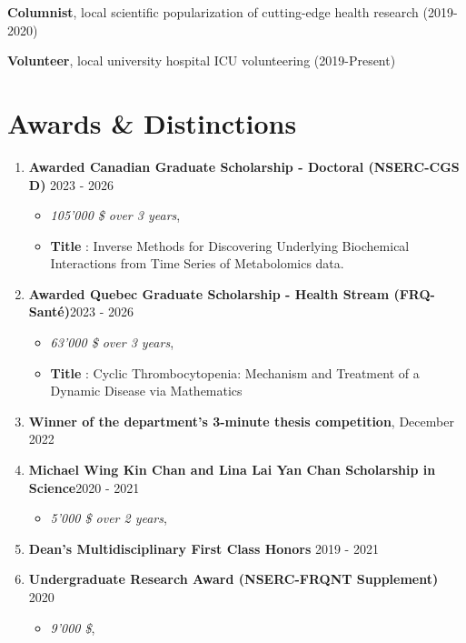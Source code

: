 \documentclass{article}
\newcommand{\cvsection}[1]{\section*{\rmfamily#1}}
\begin{document}
\textbf{Columnist}, local scientific popularization of cutting-edge health research \hfill (2019-2020)

\textbf{Volunteer}, local university hospital ICU volunteering \hfill (2019-Present)



\cvsection{Awards \& Distinctions}
\indent
\begin{enumerate}
    \item \textbf{Awarded Canadian Graduate Scholarship - Doctoral (NSERC-CGS D) }\hfill 2023 - 2026
    \begin{itemize}[leftmargin=1em, itemsep=0pt]
        \item[] \textit{105'000 \$ over 3 years},
        \item[] \textbf{Title} : Inverse Methods for Discovering Underlying Biochemical Interactions from Time Series of Metabolomics data.
    \end{itemize}

    \item \textbf{Awarded Quebec Graduate Scholarship - Health Stream (FRQ-Santé)}\hfill 2023 - 2026
    \begin{itemize}[leftmargin=1em,itemsep=0pt]
        \item[] \textit{63'000 \$ over 3 years},
        \item[] \textbf{Title} : Cyclic Thrombocytopenia: Mechanism and Treatment of a Dynamic Disease via Mathematics
    \end{itemize}

    \item \textbf{Winner of the department's 3-minute thesis competition}, \hfill December 2022

    \item \textbf{Michael Wing Kin Chan and Lina Lai Yan Chan Scholarship in Science}\hfill 2020 - 2021
    \begin{itemize}[leftmargin=1em,itemsep=0pt]
        \item[] \textit{5'000 \$ over 2 years},
    \end{itemize}

    \item \textbf{Dean's Multidisciplinary First Class Honors} \hfill 2019 - 2021

    \item \textbf{Undergraduate Research Award (NSERC-FRQNT Supplement)} \hfill 2020
    \begin{itemize}[leftmargin=1em,itemsep=0pt]
        \item[] \textit{9'000 \$},
    \end{itemize}
\end{enumerate}
\end{document}
